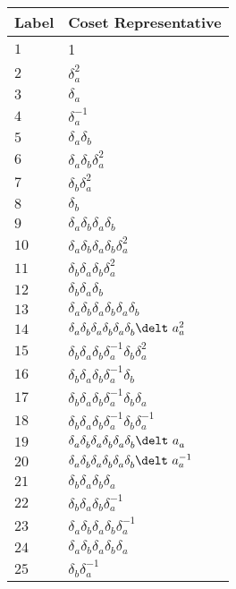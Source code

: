 \documentclass{article}
\begin{document}
\begin{center}
\begin{tabular}{ll}
\toprule
Label & Coset Representative\\
\midrule
$1$ & 1 \\
$2$ & $\delta_a^{2}$ \\
$3$ & $\delta_a^{}$ \\
$4$ & $\delta_a^{-1}$ \\
$5$ & $\delta_a^{}\delta_b^{}$ \\
$6$ & $\delta_a^{}\delta_b^{}\delta_a^{2}$ \\
$7$ & $\delta_b^{}\delta_a^{2}$ \\
$8$ & $\delta_b^{}$ \\
$9$ & $\delta_a^{}\delta_b^{}\delta_a^{}\delta_b^{}$ \\
$10$ & $\delta_a^{}\delta_b^{}\delta_a^{}\delta_b^{}\delta_a^{2}$ \\
$11$ & $\delta_b^{}\delta_a^{}\delta_b^{}\delta_a^{2}$ \\
$12$ & $\delta_b^{}\delta_a^{}\delta_b^{}$ \\
$13$ & $\delta_a^{}\delta_b^{}\delta_a^{}\delta_b^{}\delta_a^{}\delta_b^{}$ \\
$14$ & $\delta_a^{}\delta_b^{}\delta_a^{}\delta_b^{}\delta_a^{}\delta_b^{}\delt\
a_a^{2}$ \\
$15$ & $\delta_b^{}\delta_a^{}\delta_b^{}\delta_a^{-1}\delta_b^{}\delta_a^{2}$ 
\\
$16$ & $\delta_b^{}\delta_a^{}\delta_b^{}\delta_a^{-1}\delta_b^{}$ \\
$17$ & $\delta_b^{}\delta_a^{}\delta_b^{}\delta_a^{-1}\delta_b^{}\delta_a^{}$ \\
$18$ & $\delta_b^{}\delta_a^{}\delta_b^{}\delta_a^{-1}\delta_b^{}\delta_a^{-1}$ 
\\
$19$ & $\delta_a^{}\delta_b^{}\delta_a^{}\delta_b^{}\delta_a^{}\delta_b^{}\delt\
a_a^{}$ \\
$20$ & $\delta_a^{}\delta_b^{}\delta_a^{}\delta_b^{}\delta_a^{}\delta_b^{}\delt\
a_a^{-1}$ \\
$21$ & $\delta_b^{}\delta_a^{}\delta_b^{}\delta_a^{}$ \\
$22$ & $\delta_b^{}\delta_a^{}\delta_b^{}\delta_a^{-1}$ \\
$23$ & $\delta_a^{}\delta_b^{}\delta_a^{}\delta_b^{}\delta_a^{-1}$ \\
$24$ & $\delta_a^{}\delta_b^{}\delta_a^{}\delta_b^{}\delta_a^{}$ \\
$25$ & $\delta_b^{}\delta_a^{-1}$ \\

\end{tabular}
\end{center}
\end{document}
